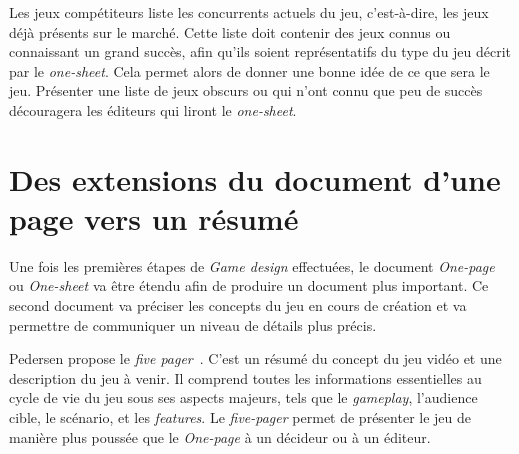 
Les jeux compétiteurs liste les concurrents actuels du jeu, c'est-\`a-dire, les jeux déjà présents sur le marché.
Cette liste doit contenir des jeux connus ou connaissant un grand succès, afin qu'ils soient représentatifs du type du jeu d\'ecrit par le \emph{one-sheet}.
Cela permet alors de donner une bonne idée de ce que sera le jeu.
Présenter une liste de jeux obscurs ou qui n'ont connu que peu de succès découragera les éditeurs qui liront le \emph{one-sheet}.




\section{Des extensions du document d'une page vers un résumé}
Une fois les premières étapes de \emph{Game design} effectuées, le document \emph{One-page} ou \emph{One-sheet} va être étendu afin de produire un document plus important.
Ce second document va préciser les concepts du jeu en cours de création et va permettre de communiquer un niveau de détails plus précis.

Pedersen propose le \emph{five pager}~\cite{GD_foundations_pedersen}. C'est un résumé du concept du jeu vidéo et une description du jeu à venir.
Il comprend toutes les informations essentielles au cycle de vie du jeu sous ses aspects majeurs, tels que le \emph{gameplay}, l'audience cible, le scénario, et les \emph{features}.
Le \emph{five-pager} permet de présenter le jeu de manière plus poussée que le \emph{One-page} à un décideur ou à un éditeur.







